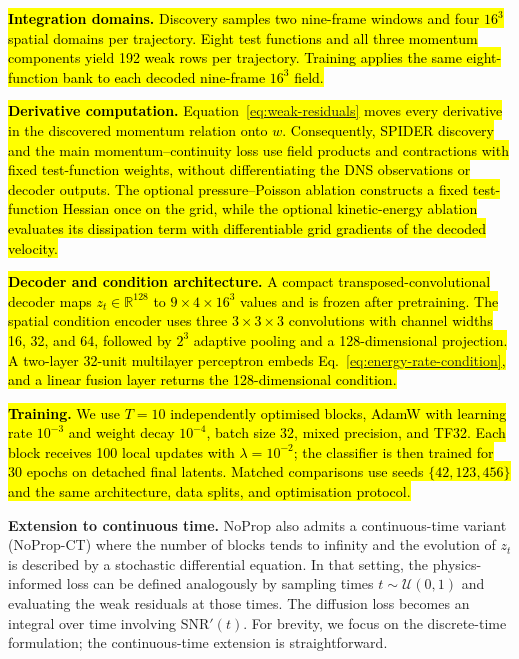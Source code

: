 \documentclass[preprint,12pt]{elsarticle}
\newcommand{\rev}[1]{\hl{#1}}
\begin{document}
\rev{\textbf{Integration domains.} Discovery samples two nine-frame windows and four $16^3$ spatial domains per trajectory. Eight test functions and all three momentum components yield 192 weak rows per trajectory. Training applies the same eight-function bank to each decoded nine-frame $16^3$ field.}

\rev{\textbf{Derivative computation.} Equation~\eqref{eq:weak-residuals} moves every derivative in the discovered momentum relation onto $w$. Consequently, SPIDER discovery and the main momentum--continuity loss use field products and contractions with fixed test-function weights, without differentiating the DNS observations or decoder outputs. The optional pressure--Poisson ablation constructs a fixed test-function Hessian once on the grid, while the optional kinetic-energy ablation evaluates its dissipation term with differentiable grid gradients of the decoded velocity.}

\rev{\textbf{Decoder and condition architecture.} A compact transposed-convolutional decoder maps $z_t\in\mathbb R^{128}$ to $9\times4\times16^3$ values and is frozen after pretraining. The spatial condition encoder uses three $3\times3\times3$ convolutions with channel widths 16, 32, and 64, followed by $2^3$ adaptive pooling and a 128-dimensional projection. A two-layer 32-unit multilayer perceptron embeds Eq.~\eqref{eq:energy-rate-condition}, and a linear fusion layer returns the 128-dimensional condition.}

\rev{\textbf{Training.} We use $T=10$ independently optimised blocks, AdamW with learning rate $10^{-3}$ and weight decay $10^{-4}$, batch size 32, mixed precision, and TF32. Each block receives 100 local updates with $\lambda=10^{-2}$; the classifier is then trained for 30 epochs on detached final latents. Matched comparisons use seeds $\{42,123,456\}$ and the same architecture, data splits, and optimisation protocol.}

\textbf{Extension to continuous time.} NoProp also admits a continuous-time variant (NoProp-CT) \cite{li2025noprop} where the number of blocks tends to infinity and the evolution of $z_t$ is described by a stochastic differential equation. In that setting, the physics-informed loss can be defined analogously by sampling times $t\sim\mathcal{U}(0,1)$ and evaluating the weak residuals at those times. The diffusion loss becomes an integral over time involving $\mathrm{SNR}'(t)$. For brevity, we focus on the discrete-time formulation; the continuous-time extension is straightforward.
\end{document}
